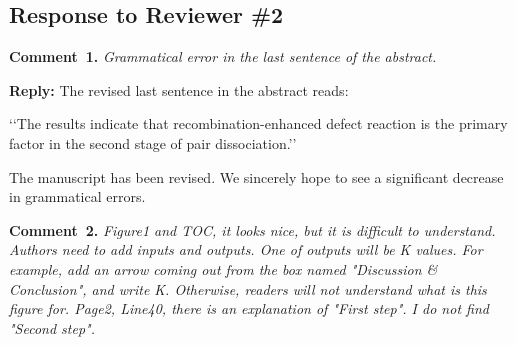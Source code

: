 \documentclass{WileyMSP-template}
\begin{document}







\vspace{1cm}
\subsection*{Response to Reviewer \#2 }


\noindent
\textcolor[rgb]{0.00,0.50,1.00}{\textbf{Comment~1.}}
\emph{Grammatical error in the last sentence of the abstract.}


\noindent
\textcolor[rgb]{0.51,0.00,0.00}{\textbf{Reply:}}
The revised last sentence in the abstract reads:

‘‘The results indicate that recombination-enhanced defect reaction is the primary factor in the second stage of pair dissociation.’’

The manuscript has been revised.
We sincerely hope to see a significant decrease in grammatical errors.



\vspace{1cm}
\noindent
\textcolor[rgb]{0.00,0.50,1.00}{\textbf{Comment~2.}}
\emph{Figure1 and TOC, it looks nice, but it is difficult to understand.
Authors need to add inputs and outputs.
One of outputs will be K values.
For example, add an arrow coming out from the box named "Discussion \& Conclusion",
and write K.
Otherwise, readers will not understand what is this figure for.
Page2, Line40, there is an explanation of "First step".
I do not find "Second step".}
\end{document}
